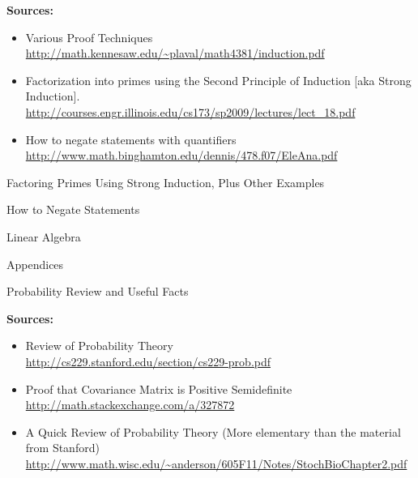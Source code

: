 \documentclass[12pt,letterpaper,headings=normal]{scrartcl}
\begin{document}
\textbf{Sources:}
{\footnotesize
\begin{itemize}
\item Various Proof Techniques\\
\url{http://math.kennesaw.edu/~plaval/math4381/induction.pdf}
\item  Factorization into primes using the Second Principle of Induction [aka Strong Induction].\\ \url{http://courses.engr.illinois.edu/cs173/sp2009/lectures/lect_18.pdf}
\item How to negate statements with quantifiers \\
\url{http://www.math.binghamton.edu/dennis/478.f07/EleAna.pdf}
\end{itemize}
}

\vspace*{\fill}
Factoring Primes Using Strong Induction, Plus Other Examples
\vspace*{\fill}

\vspace*{\fill}
How to Negate Statements
\vspace*{\fill}


\newpage
\vspace*{10cm}
{\Large 
\begin{center}
Linear Algebra
\end{center}
}
\newpage



\newpage
{\Huge 
\begin{center}
Appendices
\end{center}
}
\newpage
\vspace*{10cm}
{\Large 
\begin{center}
Probability Review and Useful Facts
\end{center}
}
\newpage

\textbf{Sources:}
{\footnotesize
\begin{itemize}
\item Review of Probability Theory\\
\url{http://cs229.stanford.edu/section/cs229-prob.pdf}
\item Proof that Covariance Matrix is Positive Semidefinite\\
 \url{http://math.stackexchange.com/a/327872}
\item A Quick Review of Probability Theory  (More elementary than the material from Stanford)\\
\url{http://www.math.wisc.edu/~anderson/605F11/Notes/StochBioChapter2.pdf}
\end{itemize}
}



\end{document}
